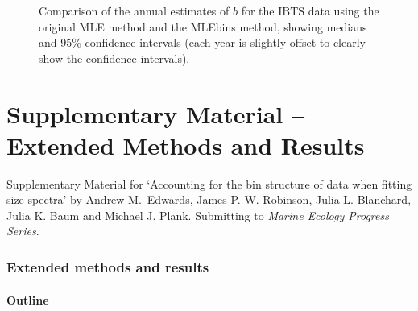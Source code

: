 \documentclass[12pt, letter]{article}
\begin{document}
\begin{figure}[tp]
\begin{center}
\epsfxsize=6in
  \end{center}
  \caption{Comparison of the annual estimates of
  $b$ for the IBTS data using the original MLE method and the MLEbins method,
  showing medians and 95\% confidence intervals (each year is slightly offset
  to clearly show the confidence intervals).}
\label{fig:nSeaFung/nSeaFungCompareTrends}
\end{figure}

\clearpage



\part{Supplementary Material -- Extended Methods and Results} %

\appendix

\setcounter{section}{0} \setcounter{table}{0} \setcounter{figure}{0}
\setcounter{equation}{0}
\setcounter{page}{1}

\renewcommand{\thesection}{S.\arabic{section}}
\renewcommand{\thetable}{S.\arabic{table}}
\renewcommand{\thefigure}{S.\arabic{figure}}
\renewcommand{\theequation}{S.\arabic{equation}}


Supplementary Material for `Accounting for the bin structure of data when
  fitting size spectra' by Andrew M.~Edwards, James P. W. Robinson, Julia
  L. Blanchard, Julia K. Baum and Michael J. Plank. Submitting to
  \emph{Marine Ecology Progress Series}.\\


\parttoc %




\section{Extended methods and results}

\subsection{Outline}
\end{document}
